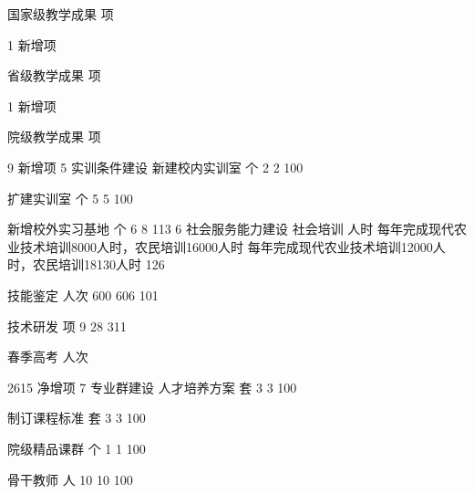 国家级教学成果
项

1
新增项


省级教学成果
项

1
新增项


院级教学成果
项

9
新增项
5
实训条件建设
新建校内实训室
个
2
2
100%


扩建实训室
个
5
5
100%


新增校外实习基地
个
6
8
113%
6
社会服务能力建设
社会培训
人时
每年完成现代农业技术培训8000人时，农民培训16000人时
每年完成现代农业技术培训12000人时，农民培训18130人时
126%


技能鉴定
人次
600
606
101%


技术研发
项
9
28
311%


春季高考
人次

2615
净增项
7
专业群建设
人才培养方案
套
3
3
100%


制订课程标准
套
3
3
100%


院级精品课群
个
1
1
100%


骨干教师
人
10
10
100%


